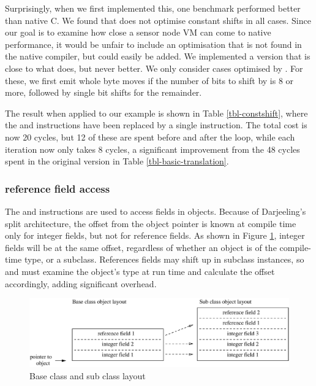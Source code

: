 Surprisingly, when we first implemented this, one benchmark performed better than native C. We found that  does not optimise constant shifts in all cases. Since our goal is to examine how close a sensor node VM can come to native performance, it would be unfair to include an optimisation that is not found in the native compiler, but could easily be added. We implemented a version that is close to what  does, but never better. We only consider cases optimised by . For these, we first emit whole byte moves if the number of bits to shift by is 8 or more, followed by single bit shifts for the remainder.

The result when applied to our example is shown in Table \ref{tbl-constshift}, where the  and  instructions have been replaced by a single  instruction. The total cost is now 20 cycles, but 12 of these are spent before and after the loop, while each iteration now only takes 8 cycles, a significant improvement from the 48 cycles spent in the original version in Table \ref{tbl-basic-translation}.


\subsubsection{ reference field access}
The  and  instructions are used to access fields in objects. Because of Darjeeling's split architecture, the offset from the object pointer is known at compile time only for integer fields, but not for reference fields. As shown in Figure \ref{fig-super-class-sub-class-field-layout}, integer fields will be at the same offset, regardless of whether an object is of the compile-time type, or a subclass. References fields may shift up in subclass instances, so  and  must examine the object's type at run time and calculate the offset accordingly, adding significant overhead.

\begin{figure}
\centering
\includegraphics[width=0.7\linewidth]{super-class-sub-class-field-layout.eps}
\caption{Base class and sub class layout}
\label{fig-super-class-sub-class-field-layout}
\end{figure}

